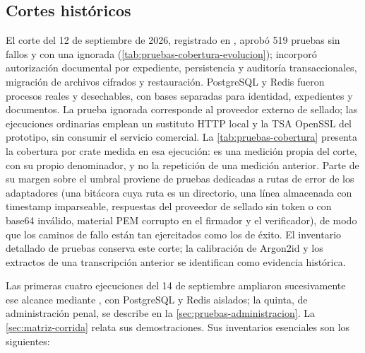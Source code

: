 \subsection{Cortes históricos}\label{sec:pruebas-cortes-historicos}

El corte del 12 de septiembre de 2026, registrado en , aprobó 519 pruebas sin fallos y con una ignorada (\cref{tab:pruebas-cobertura-evolucion}); incorporó autorización documental por expediente, persistencia y auditoría transaccionales, migración de archivos cifrados y restauración. PostgreSQL y Redis fueron procesos reales y desechables, con bases separadas para identidad, expedientes y documentos. La prueba ignorada corresponde al proveedor externo de sellado; las ejecuciones ordinarias emplean un sustituto HTTP local y la TSA OpenSSL del prototipo, sin consumir el servicio comercial. La \cref{tab:pruebas-cobertura} presenta la cobertura por crate medida en esa ejecución: es una medición propia del corte, con su propio denominador, y no la repetición de una medición anterior. Parte de su margen sobre el umbral proviene de pruebas dedicadas a rutas de error de los adaptadores (una bitácora cuya ruta es un directorio, una línea almacenada con timestamp imparseable, respuestas del proveedor de sellado sin token o con base64 inválido, material PEM corrupto en el firmador y el verificador), de modo que los caminos de fallo están tan ejercitados como los de éxito. El inventario detallado de pruebas conserva este corte; la calibración de Argon2id y los extractos de una transcripción anterior se identifican como evidencia histórica.

Las primeras cuatro ejecuciones del 14 de septiembre ampliaron sucesivamente ese alcance mediante , con PostgreSQL y Redis aislados; la quinta, de administración penal, se describe en la \cref{sec:pruebas-administracion}. La \cref{sec:matriz-corrida} relata sus demostraciones. Sus inventarios esenciales son los siguientes:


